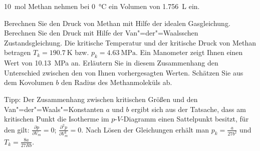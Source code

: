 \documentclass[DIV11]{scrartcl}
\begin{document}
\begin{question}[name=Van-der-Waalssche Zustandsgleichung III,ID=vdW:3]
\SI{10}{\mole} Methan nehmen bei \SI{0}{\celsius} ein Volumen von
\SI{1.756}{\liter} ein.
\begin{tasks}
  \task Berechnen Sie den Druck von Methan mit Hilfe der idealen Gasgleichung.
  \task Berechnen Sie den Druck mit Hilfe der Van"=der"=Waalsschen
    Zu\-stands\-glei\-chung.  Die kritische Temperatur und der kritische Druck
    von Methan betragen $T_k = \SI{190.7}{\kelvin}$ bzw. $p_k =
    \SI{4.63}{\mega\pascal}$.
  \task Ein Manometer zeigt Ihnen einen Wert von \SI{10.13}{\mega\pascal} an.
    Erläutern Sie in diesem Zusammenhang den Unterschied zwischen den von
    Ihnen vorhergesagten Werten.
  \task Schätzen Sie aus dem Kovolumen $b$ den Radius des Methanmoleküls ab.
\end{tasks}
Tipp: Der Zusammenhang zwischen kritischen Größen und den
Van"=der"=Waals"=Konstanten $a$ und $b$ ergibt sich aus der Tatsache, dass am
kritischen Punkt die Isotherme im $p$-$V$-Diagramm einen Sattelpunkt besitzt,
für den gilt: $\frac{\partial p}{\partial V_m} = 0$; $\frac{\partial
  ^2p}{\partial V_m^2} = 0$.  Nach Lösen der Gleichungen erhält man $p_k =
\frac{a}{27b^2}$ und $T_k = \frac{8a}{27Rb}$.
\end{question}
\end{document}
